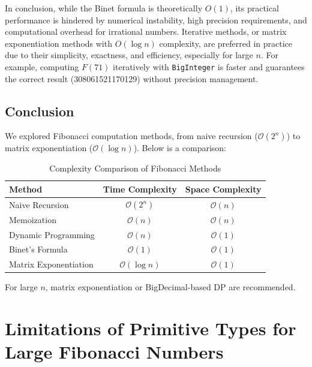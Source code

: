 \documentclass{article}
\begin{document}
In conclusion, while the Binet formula is theoretically \(O(1)\), its practical performance is hindered by numerical instability, high precision requirements, and computational overhead for irrational numbers. Iterative methods, or matrix exponentiation methods with \(O(\log n)\) complexity, are preferred in practice due to their simplicity, exactness, and efficiency, especially for large \(n\). For example, computing \(F(71)\) iteratively with \texttt{BigInteger} is faster and guarantees the correct result (308061521170129) without precision management.


\subsection{Conclusion}
We explored Fibonacci computation methods, from naive recursion ($\mathcal{O}(2^n)$) to matrix exponentiation ($\mathcal{O}(\log n)$). Below is a comparison:

\begin{table}[h]
	\centering
	\begin{tabular}{|l|c|c|}
		\hline
		\textbf{Method} & \textbf{Time Complexity} & \textbf{Space Complexity} \\
		\hline
		Naive Recursion & $\mathcal{O}(2^n)$ & $\mathcal{O}(n)$ \\
		Memoization & $\mathcal{O}(n)$ & $\mathcal{O}(n)$ \\
		Dynamic Programming & $\mathcal{O}(n)$ & $\mathcal{O}(1)$ \\
		Binet's Formula & $\mathcal{O}(1)$ & $\mathcal{O}(1)$ \\
		Matrix Exponentiation & $\mathcal{O}(\log n)$ & $\mathcal{O}(1)$ \\
		\hline
	\end{tabular}
	\caption{Complexity Comparison of Fibonacci Methods}
\end{table}

For large $n$, matrix exponentiation or BigDecimal-based DP are recommended.

\section{Limitations of Primitive Types for Large Fibonacci Numbers}
\end{document}
